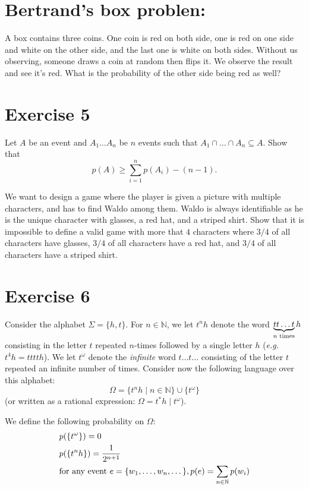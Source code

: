 \documentclass{article}
\begin{document}
\section*{Bertrand's box problen:}
A box contains three coins. One coin is red on both side, one is red on one side and white on the other side, and the last one is white on both sides. Without us observing, someone draws a coin at random then flips it. We observe the result and see it's red. What is the probability of the other side being red as well?


\section*{Exercise 5}
Let $A$ be an event and $A_1 \dots A_n$ be $n$ events such that $A_1 \cap \dots \cap A_n \subseteq A$. Show that
\[p(A) \ge \sum^n_{i=1} p(A_i) - (n-1).\]

We want to design a game where the player is given a picture with multiple characters, and has to find Waldo among them. Waldo is always identifiable as he is the unique character with glasses, a red hat, and a striped shirt. Show that it is impossible to define a valid game with more that $4$ characters where $3/4$ of all characters have glasses, $3/4$ of all characters have a red hat, and $3/4$ of all characters have a striped shirt.

\section*{Exercise 6}
Consider the alphabet $\Sigma = \{h, t\}$. For $n \in \mathbb{N}$, we let $t^{n}h$ denote the word $\underbrace{tt\dots t}_{n \textnormal{ times}}h$ consisting in the letter $t$ repeated $n$-times followed by a single letter $h$ (\emph{e.g.} $t^{4}h = tttth$). We let $t^{\omega}$ denote the \emph{infinite} word $t \dots t \dots$ consisting of the letter $t$ repeated an infinite number of times. Consider now the following language over this alphabet:
\[ \Omega = \{ t^{n}h \mid n \in \mathbb{N} \} \cup \{t^{\omega}\}  \]
(or written as a rational expression: $\Omega = t^*h \mid t^{\omega}$).

We define the following probability on $\Omega$:
\[ \begin{aligned}
  &p(\{t^{\omega}\}) = 0\\
  &p(\{t^n h\}) =  \frac{1}{2^{n+1}} \\
  &\textnormal{for any event } e = \{w_1, \dots, w_n, \dots \}, p(e) = \sum_{n \in \mathbb{N}} p(w_i)
\end{aligned} \]
\end{document}
